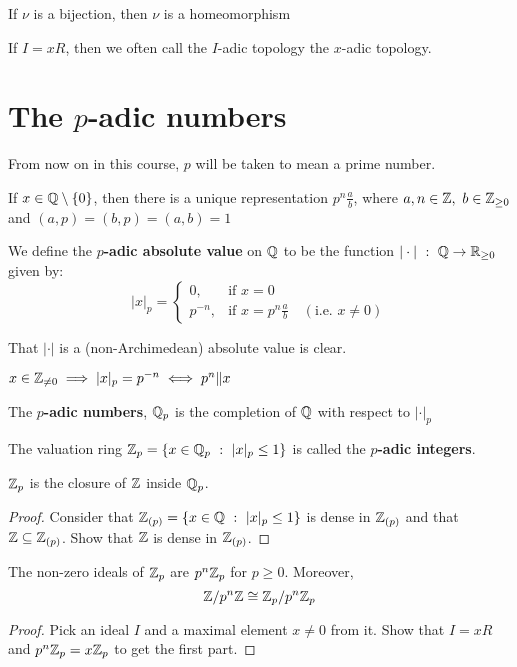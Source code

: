 \documentclass[a4paper]{article}
\begin{document}
{\begin{exer}
	If $\nu$ is a bijection, then $\nu$ is a homeomorphism
\end{exer}

If $I=xR$, then we often call the $I$-adic topology the $x$-adic topology.

\section{The $p$-adic numbers}
From now on in this course, $p$ will be taken to mean a prime number.

If $x\in\mathbb{Q} \setminus \{0\}$, then there is a unique representation $p^n\frac{a}{b}$, where $a,n\in\mathbb{Z},\ b\in\mathbb{Z}_{\geq 0}$ and $(a,p)=(b,p)=(a,b)=1$

\begin{defi}
	We define the \textbf{$p$-adic absolute value} on $\mathbb{Q}$ to be the function $|\cdot|\ :\ \Q\to\R_{\geq0}$ given by:
	\[
		|x|_p =
		\begin{cases}
			0, & \text{if } x=0\\
			p^{-n}, & \text{if } x=p^n\frac{a}{b}\quad(\text{i.e. }x\neq0)
		\end{cases}
	\]
\end{defi}

That $|\cdot|$ is a (non-Archimedean) absolute value is clear.

\begin{fact}
	$x\in\mathbb{Z}_{\neq0}\implies|x|_p=p^{-n}\iff p^n\|x$
\end{fact}

\begin{defi-num}
	The \textbf{$p$-adic numbers}, $\mathbb{Q}_p$ is the completion of $\mathbb{Q}$ with respect to $|\cdot|_p$
	
	The valuation ring $\Z_p=\{x\in\Q_p\ :\ |x|_p\leq1\}$ is called the \textbf{$p$-adic integers}.
\end{defi-num}

\begin{prop-num}
	$\mathbb{Z}_p$ is the closure of $\mathbb{Z}$ inside $\mathbb{Q}_p$.
\end{prop-num}
\begin{proof}
	Consider that $\mathbb{Z}_{(p)}=\{x\in\mathbb{Q}\ :\ |x|_p\leq1\}$ is dense in $\mathbb{Z}_{(p)}$ and that $\mathbb{Z}\subseteq\mathbb{Z}_{(p)}$. Show that $\mathbb{Z}$ is dense in $\mathbb{Z}_{(p)}$.
\end{proof}

\begin{prop-num}
	The non-zero ideals of $\mathbb{Z}_p$ are $p^n\mathbb{Z}_p$ for $p\geq0$. Moreover,
	\[
		\mathbb{Z}/p^n\mathbb{Z}\cong\mathbb{Z}_p/p^n\mathbb{Z}_p
	\]
\end{prop-num}
\begin{proof}
	Pick an ideal $I$ and a maximal element $x\neq0$ from it. Show that $I=xR$ and $p^n\mathbb{Z}_p=x\mathbb{Z}_p$ to get the first part.
	

\end{proof}}
\end{document}
